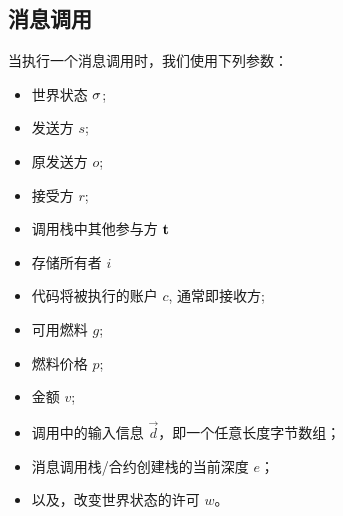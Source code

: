 

\subsection{消息调用}\label{sec:execution}
当执行一个消息调用时，我们使用下列参数：
\begin{itemize}[nosep]
	\item 世界状态 ${\mathbf{\sigma}}$;
	
	\item 发送方 $s$;

	\item 原发送方 $o$;

	\item 接受方 $r$;
	
	\item 调用栈中其他参与方 ${\bf t}$
	
	\item 存储所有者 $i$

	\item 代码将被执行的账户 $c$, 通常即接收方; 

	\item 可用燃料 $g$;

	\item 燃料价格 $p$;

	\item 金额 $v$;

	\item 调用中的输入信息 $\vec{d}$，即一个任意长度字节数组；

	\item 消息调用栈/合约创建栈的当前深度 $e$；

	\item 以及，改变世界状态的许可 $w$。
\end{itemize}

